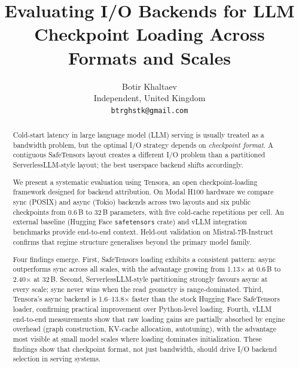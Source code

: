 \documentclass[10pt,letterpaper]{article}
\title{Evaluating I/O Backends for LLM Checkpoint Loading Across Formats and Scales}
\author{
  Botir Khaltaev\\
  Independent, United Kingdom\\
  \texttt{btrghstk@gmail.com}
}
\begin{document}
\maketitle

\begin{abstract}
Cold-start latency in large language model (LLM) serving is usually treated as a bandwidth problem, but the optimal I/O strategy depends on \emph{checkpoint format}. A contiguous SafeTensors layout creates a different I/O problem than a partitioned ServerlessLLM-style layout; the best userspace backend shifts accordingly.

We present a systematic evaluation using Tensora, an open checkpoint-loading framework designed for backend attribution. On Modal H100 hardware we compare sync (POSIX) and async (Tokio) backends across two layouts and six public checkpoints from 0.6\,B to 32\,B parameters, with five cold-cache repetitions per cell. An external baseline (Hugging Face \texttt{safetensors} crate) and vLLM integration benchmarks provide end-to-end context. Held-out validation on Mistral-7B-Instruct confirms that regime structure generalises beyond the primary model family.

Four findings emerge. First, SafeTensors loading exhibits a consistent pattern: async outperforms sync across all scales, with the advantage growing from 1.13$\times$ at 0.6\,B to 2.40$\times$ at 32\,B. Second, ServerlessLLM-style partitioning strongly favours async at every scale; sync never wins when the read geometry is range-dominated. Third, Tensora's async backend is 1.6--13.8$\times$ faster than the stock Hugging Face SafeTensors loader, confirming practical improvement over Python-level loading. Fourth, vLLM end-to-end measurements show that raw loading gains are partially absorbed by engine overhead (graph construction, KV-cache allocation, autotuning), with the advantage most visible at small model scales where loading dominates initialization. These findings show that checkpoint format, not just bandwidth, should drive I/O backend selection in serving systems.
\end{abstract}











\appendix




\end{document}
